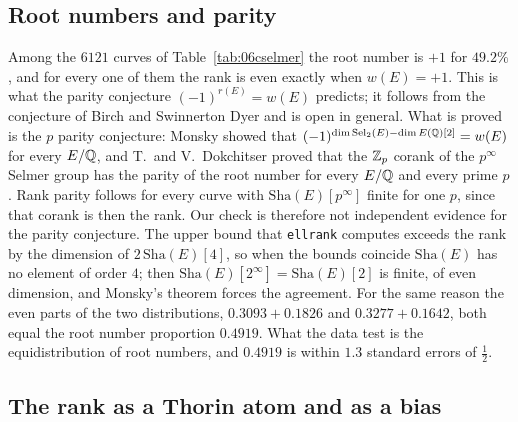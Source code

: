 \subsection{Root numbers and parity}\label{sec:06cparity}

Among the $6121$ curves of Table~\ref{tab:06cselmer} the root number is $+1$ for $49.2\%$, and for every one of them the rank is even exactly when $w(E) = +1$. This is what the parity conjecture $(-1)^{r(E)} = w(E)$ predicts; it follows from the conjecture of Birch and Swinnerton Dyer and is open in general. What is proved is the $p$ parity conjecture: Monsky \cite{monsky1996} showed that $(-1)^{\dim\operatorname{Sel}_2(E)-\dim E(\mathbb{Q})[2]} = w(E)$ for every $E/\mathbb{Q}$, and T.~and V.~Dokchitser \cite{dokchitser2010} proved that the $\mathbb{Z}_p$ corank of the $p^\infty$ Selmer group has the parity of the root number for every $E/\mathbb{Q}$ and every prime $p$. Rank parity follows for every curve with $\mathrm{Sha}(E)[p^\infty]$ finite for one $p$, since that corank is then the rank. Our check is therefore not independent evidence for the parity conjecture. The upper bound that \texttt{ellrank} computes exceeds the rank by the dimension of $2\,\mathrm{Sha}(E)[4]$, so when the bounds coincide $\mathrm{Sha}(E)$ has no element of order $4$; then $\mathrm{Sha}(E)[2^\infty] = \mathrm{Sha}(E)[2]$ is finite, of even dimension, and Monsky's theorem forces the agreement. For the same reason the even parts of the two distributions, $0.3093+0.1826$ and $0.3277+0.1642$, both equal the root number proportion $0.4919$. What the data test is the equidistribution of root numbers, and $0.4919$ is within $1.3$ standard errors of $\frac12$.

\subsection{The rank as a Thorin atom and as a bias}

